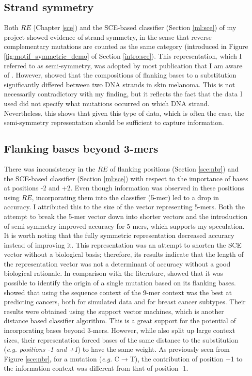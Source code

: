 \subsection{Strand symmetry}
Both $RE$ (Chapter \ref{sce}) and the SCE-based classifier (Section \ref{ml:sce}) of my project showed evidence of strand symmetry, in the sense that reverse complementary mutations are counted as the same category (introduced in Figure \ref{fig:motif_symmetric_demo} of Section \ref{intro:sce}). This representation, which I referred to as semi-symmetry, was adopted by most publication that I am aware of \citep{Alexandrov2020,Jiao2020,Zhang2020}. However, \citet{Zhu2017} showed that the compositions of flanking bases to a substitution significantly differed between two DNA strands in skin melanoma. This is not necessarily contradictory with my finding, but it reflects the fact that the data I used did not specify what mutations occurred on which DNA strand. Nevertheless, this shows that given this type of data, which is often the case, the semi-symmetry representation should be sufficient to capture information.

\subsection{Flanking bases beyond 3-mers}
There was inconsistency in the $RE$ of flanking positions (Section \ref{sce:nbr}) and the SCE-based classifier (Section \ref{ml:sce}) with respect to the importance of bases at positions -2 and +2. Even though information was observed in these positions using $RE$, incorporating them into the classifier (5-mer) led to a drop in accuracy. I attributed this to the size of the vector representing 5-mers. Both the attempt to break the 5-mer vector down into shorter vectors and the introduction of semi-symmetry improved accuracy for 5-mers, which supports my speculation. It is worth noting that the fully symmetric representation decreased accuracy instead of improving it. This representation was an attempt to shorten the SCE vector without a biological basis; therefore, its results indicate that the length of the representation vector was not a determinant of accuracy without a good biological rationale. In comparison with the literature, \citet{Zhu2020} showed that it was possible to identify the origin of a single mutation based on its flanking bases. \citep{Zhang2020} showed that using the sequence context of the 9-mer context was the best at predicting cancers, both for simulated data and for breast cancer subtypes. Their results were obtained using the support vector machines, which is another distance based classifier algorithm. This is a great support for the potential of incorporating bases beyond 3-mers. However, while \citet{Zhang2020} also split up large context sizes, their representation forced bases of the same distance to the substitution (\textit{e.g. positions -1 and +1}) to have the same weight. As previously seen from Figure \ref{sce:nbr}, for a mutation (\textit{e.g.} C$\rightarrow$T), the contribution of position +1 to the information context was different from that of position -1.

